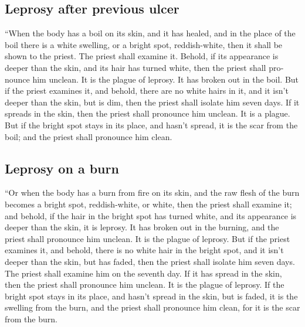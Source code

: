 \begin{paracol}{2}
\begin{otherlanguage}{english}
\hypertarget{leprosy-after-previous-ulcer}{%
\subsection{Leprosy after previous
ulcer}\label{leprosy-after-previous-ulcer}}

 ``When the body has a boil on its skin, and it has
healed,  and in the place of the boil there is a white
swelling, or a bright spot, reddish-white, then it shall be shown to the
priest.  The priest shall examine it. Behold, if its
appearance is deeper than the skin, and its hair has turned white, then
the priest shall pronounce him unclean. It is the plague of leprosy. It
has broken out in the boil.  But if the priest examines
it, and behold, there are no white hairs in it, and it isn't deeper than
the skin, but is dim, then the priest shall isolate him seven days.
 If it spreads in the skin, then the priest shall
pronounce him unclean. It is a plague.  But if the bright
spot stays in its place, and hasn't spread, it is the scar from the
boil; and the priest shall pronounce him clean.

\hypertarget{leprosy-on-a-burn}{%
\subsection{Leprosy on a burn}\label{leprosy-on-a-burn}}

 ``Or when the body has a burn from fire on its skin, and
the raw flesh of the burn becomes a bright spot, reddish-white, or
white,  then the priest shall examine it; and behold, if
the hair in the bright spot has turned white, and its appearance is
deeper than the skin, it is leprosy. It has broken out in the burning,
and the priest shall pronounce him unclean. It is the plague of leprosy.
 But if the priest examines it, and behold, there is no
white hair in the bright spot, and it isn't deeper than the skin, but
has faded, then the priest shall isolate him seven days. 
The priest shall examine him on the seventh day. If it has spread in the
skin, then the priest shall pronounce him unclean. It is the plague of
leprosy.  If the bright spot stays in its place, and
hasn't spread in the skin, but is faded, it is the swelling from the
burn, and the priest shall pronounce him clean, for it is the scar from
the burn.

\hypertarget{sores-on-the-head-and-beard}{%
}
\end{otherlanguage}
\end{paracol}
